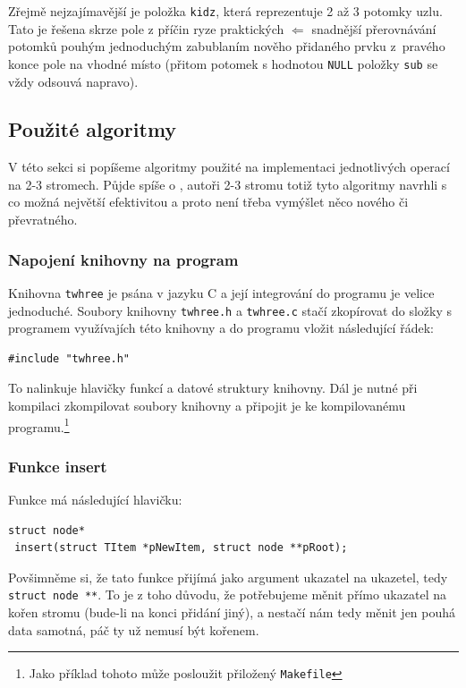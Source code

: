 \documentclass[11pt,a4paper]{article}
\begin{document}
Zřejmě nejzajímavější je položka \verb=kidz=, která reprezentuje 2 až 3 potomky uzlu.
Tato je řešena skrze pole z příčin ryze praktických $\Leftarrow$ snadnější
přerovnávání potomků pouhým jednoduchým zabublaním nověho přidaného prvku
z~pravého konce pole na vhodné místo (přitom potomek s hodnotou \verb=NULL=
položky \verb=sub= se vždy odsouvá napravo).

\subsection{Použité algoritmy}
V této sekci si popíšeme algoritmy použité na implementaci jednotlivých
operací na 2-3 stromech.
Půjde spíše o , autoři 2-3 stromu totiž tyto algoritmy
navrhli s co možná největší efektivitou a proto není třeba vymýšlet něco nového
či převratného.

\subsubsection{Napojení knihovny na program}
Knihovna \verb=twhree= je psána v jazyku C a její integrování do programu je
velice jednoduché.
Soubory knihovny \verb=twhree.h= a \verb=twhree.c= stačí zkopírovat do složky s
programem využívajích této knihovny a do programu vložit následující řádek:

\begin{verbatim}
#include "twhree.h"
\end{verbatim}

To nalinkuje hlavičky funkcí a datové struktury knihovny.
Dál je nutné při kompilaci zkompilovat soubory knihovny a připojit je ke
kompilovanému programu.\footnote{Jako příklad tohoto může posloužit přiložený
\verb~Makefile~}

\subsubsection{Funkce insert}

Funkce má následující hlavičku:

\begin{verbatim}
struct node*
 insert(struct TItem *pNewItem, struct node **pRoot);
\end{verbatim}

Povšimněme si, že tato funkce přijímá jako argument ukazatel na ukazetel, tedy
\verb~struct node **~.
To je z toho důvodu, že potřebujeme měnit přímo ukazatel na kořen stromu
(bude-li na konci přidání jiný), a nestačí nám tedy měnit jen pouhá data
samotná, páč ty už nemusí být kořenem.
\end{document}
